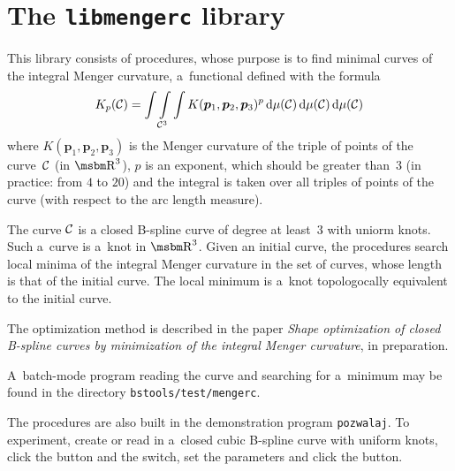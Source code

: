 

\chapter{The \texttt{libmengerc} library}

This library consists of procedures, whose purpose is to find minimal curves
of the integral Menger curvature, a~functional defined with the formula
\begin{align*}
  K_p({\cal C}) = \int\int\limits_{{\cal C}^3}\int
 K(\bm{p}_1,\bm{p}_2,\bm{p}_3)^p\,\mathrm{d}\mu({\cal C})\,\mathrm{d}\mu({\cal
 C})\,\mathrm{d}\mu({\cal C})
\end{align*}
where $K(\bm{p}_1,\bm{p}_2,\bm{p}_3)$ is the Menger curvature of the triple
of points of the curve~$\cal C$ (in $\R^3$), $p$ is an exponent, which should be
greater than~$3$ (in practice: from $4$ to $20$) and the integral is taken
over all triples of points of the curve (with respect to the arc length
measure).

The curve $\cal C$ is a closed B-spline curve of degree at least~$3$ with
uniorm knots. Such a~curve is a~knot in $\R^3$. Given an initial curve, the
procedures search local minima of the integral Menger curvature in the set
of curves, whose length is that of the initial curve. The local minimum is
a~knot topologocally equivalent to the initial curve.

The optimization method is described in the paper \emph{Shape optimization of
closed B-spline curves by minimization of the integral Menger curvature},
in preparation.

A~batch-mode program reading the curve and searching for a~minimum may be
found in the directory \texttt{bstools/test/mengerc}.

The procedures are also built in the demonstration program \texttt{pozwalaj}.
To experiment, create or read in a~closed cubic B-spline curve with uniform
knots, click the  button and the  switch, set the parameters and click the 
button.

\cprog{}

